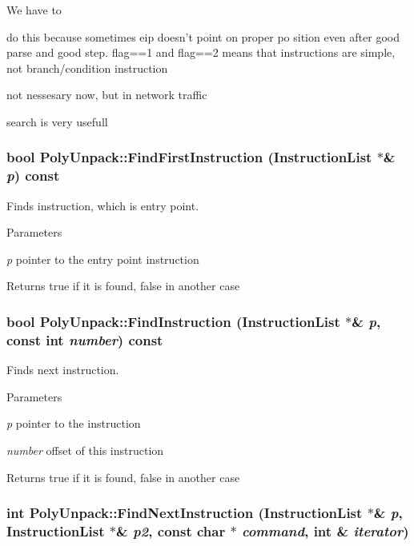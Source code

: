 We have to

do this because sometimes eip doesn't point on proper po sition even after good parse and good step. flag==1 and flag==2 means that instructions are simple, not branch/condition instruction

not nessesary now, but in network traffic

search is very usefull 

\hypertarget{classPolyUnpack_a49213dec58ad78d176c491f16bbc14c5}{
\subsubsection[{FindFirstInstruction}]{\setlength{\rightskip}{0pt plus 5cm}bool PolyUnpack::FindFirstInstruction ({\bf InstructionList} $\ast$\& {\em p}) const}}
\label{classPolyUnpack_a49213dec58ad78d176c491f16bbc14c5}
Finds instruction, which is entry point. 
\begin{DoxyParams}{Parameters}
\item[{\em p}]pointer to the entry point instruction \end{DoxyParams}
\begin{DoxyReturn}{Returns}
true if it is found, false in another case 
\end{DoxyReturn}
\hypertarget{classPolyUnpack_ae4797cec6caf7e9927e930ef58690749}{
\subsubsection[{FindInstruction}]{\setlength{\rightskip}{0pt plus 5cm}bool PolyUnpack::FindInstruction ({\bf InstructionList} $\ast$\& {\em p}, \/  const int {\em number}) const}}
\label{classPolyUnpack_ae4797cec6caf7e9927e930ef58690749}
Finds next instruction. 
\begin{DoxyParams}{Parameters}
\item[{\em p}]pointer to the instruction \item[{\em number}]offset of this instruction \end{DoxyParams}
\begin{DoxyReturn}{Returns}
true if it is found, false in another case 
\end{DoxyReturn}
\hypertarget{classPolyUnpack_a2eaa3c2d81d64f76659dadc75c931a89}{
\subsubsection[{FindNextInstruction}]{\setlength{\rightskip}{0pt plus 5cm}int PolyUnpack::FindNextInstruction ({\bf InstructionList} $\ast$\& {\em p}, \/  {\bf InstructionList} $\ast$\& {\em p2}, \/  const char $\ast$ {\em command}, \/  int \& {\em iterator})}}

